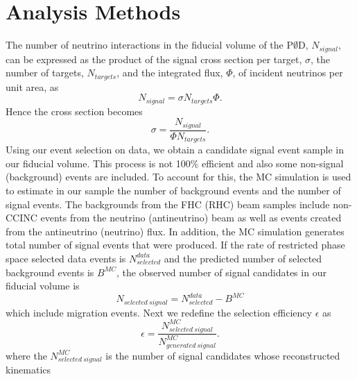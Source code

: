 \section{Analysis Methods}

The number of neutrino interactions in the fiducial volume of the P$\emptyset$D, $N_{signal}$,
can be expressed as the product of the signal cross section per target, $\sigma$, the number of targets, $N_{targets}$, and the integrated flux, $\Phi$, of incident
neutrinos per unit area, as
\begin{equation}
N_{signal}=\sigma N_{targets}\Phi.\label{eq:Analysis:1-1}
\end{equation}
Hence the cross section becomes
\begin{equation}
\sigma=\frac{N_{signal}}{\Phi N_{targets}}.\label{eq:Analysis:2-1}
\end{equation}
Using our event selection on data, we obtain a candidate signal event sample in our fiducial volume.
This process is not 100\% efficient and also some non-signal (background) events 
are included.
To account for this, the MC simulation is used to estimate in our sample
the number of background events and the number of
signal events.  The backgrounds from the FHC (RHC) beam samples
include non-CCINC events from the neutrino (antineutrino) beam as well as
events created from the antineutrino (neutrino) flux.  
In addition, the MC simulation generates
total number of signal events that were produced. 
If the rate of 
restricted phase space
selected data events is $N_{selected}^{data}$
and the predicted number of selected background events is $B^{MC}$,
the observed number of signal 
candidates 
in our fiducial volume is
\begin{equation}
N_{selected\ signal}=N_{selected}^{data}-B^{MC}\label{eq:Analysis:3-1}
\end{equation}
which include migration events.
Next we redefine the selection efficiency
$\epsilon$ as
\begin{equation}
\epsilon=\frac{N_{selected\ signal}^{MC}}{N_{generated\ signal}^{MC}}.\label{eq:Analysis:4-1}
\end{equation}
where the $N^{MC}_{selected\ signal}$ is the number of signal candidates whose reconstructed kinematics 
